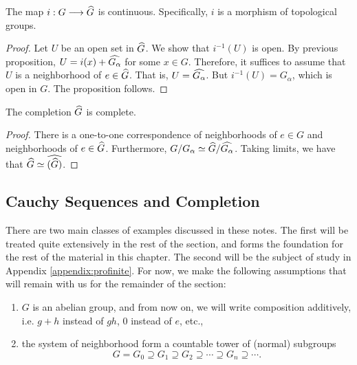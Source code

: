 \begin{prop}\label{prop:compl_is_morph_of_top_grps}
The map $i:G \longrightarrow \widehat{G}$ is continuous. Specifically, $i$
is a morphism of topological groups.
\end{prop}
\begin{proof}
Let $U$ be an open set in $\widehat{G}$. We show that $i^{-1}(U)$ 
is open. By previous proposition, $U = i(x) + \widehat{G_\alpha}$
for some $x \in G$. Therefore, it suffices to assume that $U$ is
a neighborhood of $e \in \widehat{G}$. That is, $U = 
\widehat{G_\alpha}$. But $i^{-1}(U) = G_\alpha$, which is open in
$G$. The proposition follows.
\end{proof}

\begin{cor}\label{cor:completion_is_complete}
The completion $\widehat{G}$ is complete.
\end{cor}
\begin{proof}
There is a one-to-one correspondence of neighborhoods of $e \in G$ 
and neighborhoods of $e \in \widehat{G}$. Furthermore, 
$G/G_\alpha \simeq \widehat{G}/\widehat{G_\alpha}$. Taking limits,
we have that $\widehat{G} \simeq \widehat{(\widehat{G})}$.
\end{proof}

\subsection{Cauchy Sequences and Completion}

There are two main classes of examples discussed in these notes.
The first will be treated quite extensively in the rest of the
section, and forms the foundation for the rest of the material in 
this chapter. The second will be the subject of study in Appendix 
\ref{appendix:profinite}. For now, we make the following 
assumptions that will remain with us for the remainder of the 
section:

\begin{enumerate}
\item $G$ is an abelian group, and from now on, we will write
composition additively, i.e. $g + h$ instead of $gh$, $0$ instead
of $e$, etc.,

\item the system of neighborhood form a countable tower of (normal)
subgroups
\[
G = G_0 \supseteq G_1 \supseteq G_2 \supseteq \cdots \supseteq G_n 
\supseteq \cdots.
\]

\end{enumerate}

